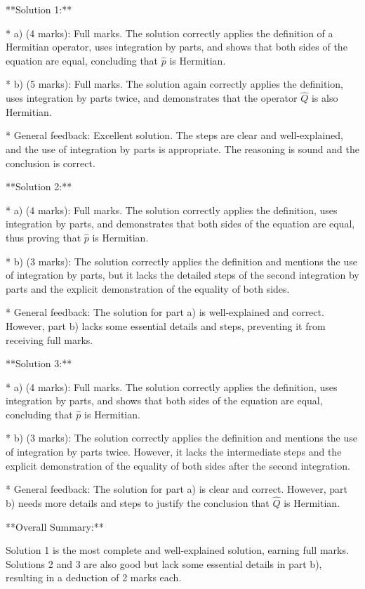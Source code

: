 \documentclass[a4paper,11pt]{article}
\begin{document}
**Solution 1:**

* a) (4 marks): Full marks. The solution correctly applies the definition of a Hermitian operator, uses integration by parts, and shows that both sides of the equation are equal, concluding that \( \hat{p} \) is Hermitian.

* b) (5 marks): Full marks. The solution again correctly applies the definition, uses integration by parts twice, and demonstrates that the operator \( \hat{Q} \) is also Hermitian.

* General feedback: Excellent solution. The steps are clear and well-explained, and the use of integration by parts is appropriate. The reasoning is sound and the conclusion is correct.

**Solution 2:**

* a) (4 marks): Full marks. The solution correctly applies the definition, uses integration by parts, and demonstrates that both sides of the equation are equal, thus proving that \( \hat{p} \) is Hermitian.

* b) (3 marks): The solution correctly applies the definition and mentions the use of integration by parts, but it lacks the detailed steps of the second integration by parts and the explicit demonstration of the equality of both sides.

* General feedback: The solution for part a) is well-explained and correct. However, part b) lacks some essential details and steps, preventing it from receiving full marks.

**Solution 3:**

* a) (4 marks): Full marks. The solution correctly applies the definition, uses integration by parts, and shows that both sides of the equation are equal, concluding that \( \hat{p} \) is Hermitian.

* b) (3 marks): The solution correctly applies the definition and mentions the use of integration by parts twice. However, it lacks the intermediate steps and the explicit demonstration of the equality of both sides after the second integration.

* General feedback: The solution for part a) is clear and correct. However, part b) needs more details and steps to justify the conclusion that \( \hat{Q} \) is Hermitian.

**Overall Summary:**

Solution 1 is the most complete and well-explained solution, earning full marks. Solutions 2 and 3 are also good but lack some essential details in part b), resulting in a deduction of 2 marks each.
\end{document}
